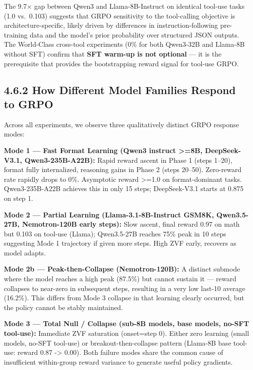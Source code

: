 \documentclass[
  american,
  11pt,
  a4paper,
  oneside]{report}
\begin{document}
The 9.7× gap between Qwen3 and Llama-8B-Instruct on identical tool-use
tasks (1.0 vs.~0.103) suggests that GRPO sensitivity to the tool-calling
objective is architecture-specific, likely driven by differences in
instruction-following pre-training data and the model's prior
probability over structured JSON outputs. The World-Class cross-tool
experiments (0\% for both Qwen3-32B and Llama-8B without SFT) confirm
that \textbf{SFT warm-up is not optional} --- it is the prerequisite
that provides the bootstrapping reward signal for tool-use GRPO.

\subsection{4.6.2 How Different Model Families Respond to
GRPO}\label{how-different-model-families-respond-to-grpo}

Across all experiments, we observe three qualitatively distinct GRPO
response modes:

\textbf{Mode 1 --- Fast Format Learning (Qwen3 instruct \textgreater=8B,
DeepSeek-V3.1, Qwen3-235B-A22B):} Rapid reward ascent in Phase 1 (steps
1--20), format fully internalized, reasoning gains in Phase 2 (steps
20--50). Zero-reward rate rapidly drops to 0\%. Asymptotic reward
\textgreater=1.0 on format-dominant tasks. Qwen3-235B-A22B achieves this
in only 15 steps; DeepSeek-V3.1 starts at 0.875 on step 1.

\textbf{Mode 2 --- Partial Learning (Llama-3.1-8B-Instruct GSM8K,
Qwen3.5-27B, Nemotron-120B early steps):} Slow ascent, final reward 0.97
on math but 0.103 on tool-use (Llama); Qwen3.5-27B reaches 75\% peak in
10 steps suggesting Mode 1 trajectory if given more steps. High ZVF
early, recovers as model adapts.

\textbf{Mode 2b --- Peak-then-Collapse (Nemotron-120B):} A distinct
submode where the model reaches a high peak (87.5\%) but cannot sustain
it --- reward collapses to near-zero in subsequent steps, resulting in a
very low last-10 average (16.2\%). This differs from Mode 3 collapse in
that learning clearly occurred, but the policy cannot be stably
maintained.

\textbf{Mode 3 --- Total Null / Collapse (sub-8B models, base models,
no-SFT tool-use):} Immediate ZVF saturation (onset=step 0). Either zero
learning (small models, no-SFT tool-use) or breakout-then-collapse
pattern (Llama-8B base tool-use: reward 0.87 -\textgreater{} 0.00). Both
failure modes share the common cause of insufficient within-group reward
variance to generate useful policy gradients.
\end{document}
